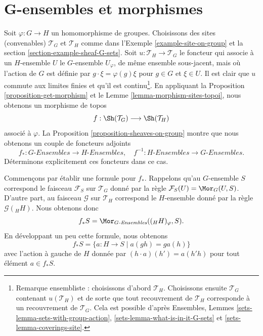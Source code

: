 \section{G-ensembles et morphismes}
\label{section-G-sets-morphisms}

\noindent
Soit $\varphi : G \to H$ un homomorphisme de groupes.
Choisissons des sites (convenables) $\mathcal{T}_G$ et $\mathcal{T}_H$ comme dans
l’Exemple \ref{example-site-on-group} et la
section \ref{section-example-sheaf-G-sets}.
Soit $u : \mathcal{T}_H \to \mathcal{T}_G$ le foncteur qui associe
à un $H$-ensemble $U$ le $G$-ensemble $U_\varphi$, de même ensemble sous-jacent,
mais où l’action de $G$ est définie par $g \cdot \xi = \varphi(g)\xi$ pour
$g \in G$ et $\xi \in U$.
Il est clair que $u$ commute aux limites finies et qu’il est
continu\footnote{Remarque ensembliste : choisissons d’abord $\mathcal{T}_H$.
Choisissons ensuite $\mathcal{T}_G$ contenant $u(\mathcal{T}_H)$ et de sorte que
tout recouvrement de $\mathcal{T}_H$ corresponde à un recouvrement de
$\mathcal{T}_G$. Cela est possible d’après
Ensembles, Lemmes
\ref{sets-lemma-sets-with-group-action},
\ref{sets-lemma-what-is-in-it-G-sets} et
\ref{sets-lemma-coverings-site}.}.
En appliquant
la Proposition \ref{proposition-get-morphism}
et le
Lemme \ref{lemma-morphism-sites-topoi},
nous obtenons un morphisme de topos
$$
f : \Sh(\mathcal{T}_G) \longrightarrow \Sh(\mathcal{T}_H)
$$
associé à $\varphi$. La
Proposition \ref{proposition-sheaves-on-group}
montre que nous obtenons un couple de foncteurs adjoints
$$
f_* : G\textit{-Ensembles} \longrightarrow H\textit{-Ensembles}, \quad
f^{-1} : H\textit{-Ensembles} \longrightarrow G\textit{-Ensembles}.
$$
Déterminons explicitement ces foncteurs dans ce cas.

\medskip\noindent
Commençons par établir une formule pour $f_*$.
Rappelons qu’au $G$-ensemble $S$ correspond le faisceau
$\mathcal{F}_S$ sur $\mathcal{T}_G$ donné par la règle
$\mathcal{F}_S(U) = \Mor_G(U, S)$. D’autre part, au
faisceau $\mathcal{G}$ sur $\mathcal{T}_H$ correspond le $H$-ensemble
donné par la règle $\mathcal{G}({}_HH)$. Nous obtenons donc
$$
f_*S = \Mor_{G\textit{-Ensembles}}(({}_HH)_\varphi, S).
$$
En développant un peu cette formule, nous obtenons
$$
f_*S = \{ a : H \to S \mid a(gh) = ga(h) \}
$$
avec l’action à gauche de $H$ donnée par
$(h \cdot a)(h') = a(h'h)$
pour tout élément $a \in f_*S$.

